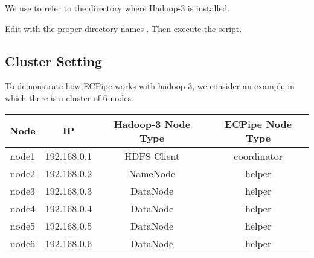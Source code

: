 \documentclass[letterpaper,12pt]{article}
\begin{document}
We use  to refer to the directory where Hadoop-3 is
installed.

\begin{center}
\noindent{}
\end{center}

Edit  with the proper directory names
. Then execute the script.

\begin{center}
\noindent{}
\end{center}

\subsection{Cluster Setting}

To demonstrate how ECPipe works with hadoop-3, we consider an example in which
there is a cluster of 6 nodes.

\begin{center}
  \begin{tabular}{|c|c|c|c|}
    \hline
    {\bf Node} & {\bf IP} & {\bf Hadoop-3 Node Type} & {\bf ECPipe Node Type} \\
    \hline
    node1 & 192.168.0.1 & HDFS Client &  coordinator \\
    \hline
    node2 & 192.168.0.2 & NameNode &  helper \\
    \hline
    node3 & 192.168.0.3 & DataNode & helper \\
    \hline
    node4 & 192.168.0.4 & DataNode & helper \\
    \hline
    node5 & 192.168.0.5 & DataNode & helper \\
    \hline
    node6 & 192.168.0.6 & DataNode & helper \\
    \hline
    \end{tabular}
\end{center}
\end{document}
